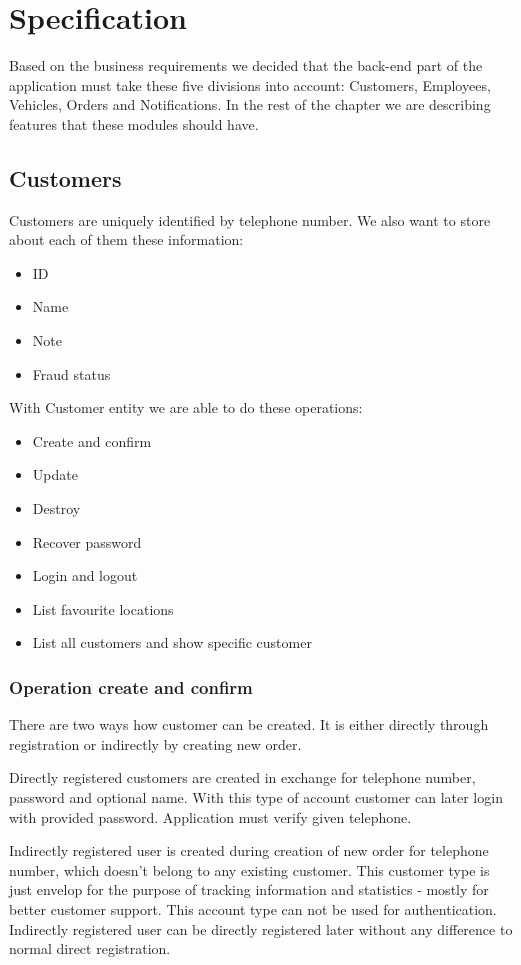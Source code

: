 \chapter{Specification}

	Based on the business requirements we decided that the back-end part of the application must take these five divisions into account: Customers, Employees, Vehicles, Orders and Notifications. In the rest of the chapter we are describing features that these modules should have.
	
	\section{Customers}
		Customers are uniquely identified by telephone number. We also want to store about each of them these information:
		\begin{itemize}
			\item ID
			\item Name
			\item Note
			\item Fraud status
		\end{itemize}
		With Customer entity we are able to do these operations:
		\begin{itemize}
			\item Create and confirm
			\item Update
			\item Destroy
			\item Recover password
			\item Login and logout
			\item List favourite locations
			\item List all customers and show specific customer
		\end{itemize}
		\subsection{Operation create and confirm}
			There are two ways how customer can be created. It is either directly through registration or indirectly by creating new order.
			
			Directly registered customers are created in exchange for telephone number, password and optional name. With this type of account customer can later login with provided password. Application must verify given telephone.
			
			Indirectly registered user is created during creation of new order for telephone number, which doesn't belong to any existing customer. This customer type is just envelop for the purpose of tracking information and statistics - mostly for better customer support. This account type can not be used for authentication. Indirectly registered user can be directly registered later without any difference to normal direct registration.
		
